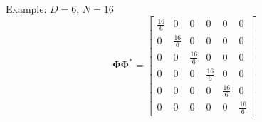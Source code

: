 \documentclass[12pt]{beamer}
\newcommand{\bfPhi}{\boldsymbol{\Phi}}
\begin{document}
\begin{frame}[noframenumbering]{Example: $D=6$, $N=16$}
\begin{equation*}
\bfPhi\bfPhi^*=\left[\begin{array}{cccccc}
    \tfrac{16}{6}  &  0  &  0  &  0  &  0  &  0\\
     0  & \tfrac{16}{6}  &  0  &  0  &  0  &  0\\
     0  &  0  & \tfrac{16}{6}  &  0  &  0  &  0\\
     0  &  0  &  0  & \tfrac{16}{6}  &  0  &  0\\
     0  &  0  &  0  &  0  & \tfrac{16}{6}  &  0\\
     0  &  0  &  0  &  0  &  0  & \tfrac{16}{6}
\end{array}\right]
\end{equation*}

\end{frame}
\end{document}
